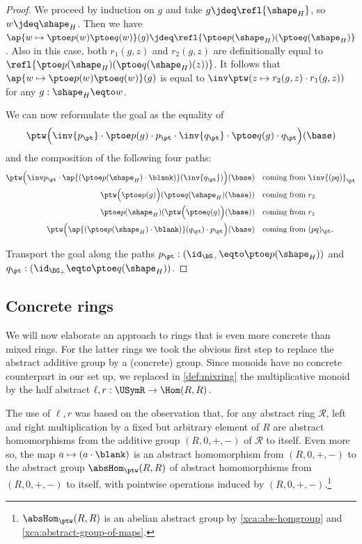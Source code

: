 \begin{proof}
We proceed by induction on $g$ and take
$g\jdeq\refl{\sh_H}$, so $w\jdeq\sh_H$. Then we have
$\ap{w\mapsto \ptoe p(w)\ptoe q(w)}(g) 
\jdeq \refl{\ptoe p(\sh_H)(\ptoe q(\sh_H)}$. Also in this case,
both $r_1(g,z)$ and $r_2(g,z)$ are definitionally equal to
$\refl{\ptoe p(\sh_H)(\ptoe q(\sh_H)(z))}$.
It follows that $\ap{w\mapsto \ptoe p(w)\ptoe q(w)}(g)$ is equal
to $\inv\ptw(z\mapsto r_2(g,z)\cdot r_1(g,z))$ for any $g:\sh_H\eqto w$. 

We can now reformulate the goal as %
the equality of 
\[
\ptw\Bigl(\inv{p_\pt} \cdot \ptoe p(g) \cdot p_\pt \cdot
\inv{q_\pt} \cdot \ptoe q(g) \cdot q_\pt\Bigr)(\base) 
\]
and the composition of the following four paths: 
\begin{align*}
\ptw\Bigl(\inv p_\pt \cdot \ap{(\ptoe p(\sh_H)\cdot\blank)}(\inv{q_\pt})\Bigr)(\base)
&\quad\text{coming from $\inv{(pq)}_\pt$} \\
\ptw\Bigl(\ptoe p(g)\Bigr)(\ptoe q(\sh_H)(\base))
&\quad\text{coming from $r_2$} \\
\ptoe p(\sh_H)(\ptw\Bigl(\ptoe q(g)\Bigr)(\base))
&\quad\text{coming from $r_1$} \\
\ptw\Bigl(\ap{(\ptoe p(\sh_H)\cdot\blank)}(q_\pt)\cdot p_\pt\Bigr)(\base) 
&\quad\text{coming from $(pq)_\pt$.}
\end{align*}

Transport the goal along the paths
$p_\pt: (\id_{\BG_\div}\eqto\ptoe p(\sh_H))$ and
$q_\pt: (\id_{\BG_\div}\eqto\ptoe q(\sh_H))$.


\end{proof}


\subsection{Concrete rings}\label{sec:concrings}

We will now elaborate an approach to rings that is even more concrete
than mixed rings. For the latter rings we took the
obvious first step to replace the abstract additive group by a 
(concrete) group. Since monoids have no concrete counterpart in our set up,
we replaced in \cref{def:mixring} the multiplicative monoid 
by the half abstract $\ell,r:\USymR\to\Hom(R,R)$.

The use of $\ell,r$ was based on the observation that, 
for any abstract ring $\mathscr R$, left and right multiplication
by a fixed but arbitrary element of $R$ are 
abstract homomorphisms from the additive group $(R,0,+,-)$ of 
$\mathscr R$ to itself. 
Even more so, the map $a\mapsto(a\cdot\blank)$ is an abstract homomorphism
from $(R,0,+,-)$ to the abstract group $\absHom_{\ptw}(R,R)$
of abstract homomorphisms from $(R,0,+,-)$ to itself, with
pointwise operations induced by $(R,0,+,-)$.\footnote{%
$\absHom_{\ptw}(R,R)$ is an abelian abstract group by
\cref{xca:abs-homgroup} and \cref{xca:abstract-group-of-maps}.}

